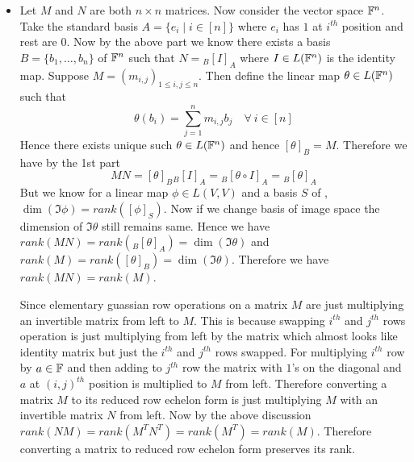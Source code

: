 \documentclass[a4paper, 11pt]{article}
\begin{document}
{\begin{itemize}[label=$\bullet$]
\begin{itemize}
\end{itemize}
Hence invertible matrices correspond to basis changes
\item Let $M$ and $N$ are both $n\times n$ matrices. Now consider the vector space $\mathbb{F}^n$. Take the standard basis $A=\{e_i\mid i\in[n]\}$ where $e_i$ has $1$ at $i^{th}$ position and rest are $0$. Now by the above part we know there exists a basis $B=\{b_1,\dots,b_n\}$ of $\mathbb{F}^n$ such that $N={}_B[I]_A$ where $I\in L(\mathbb{F}^n)$ is the identity map. Suppose $M=(m_{i,j})_{1\leq i,j\leq n}$. Then define the linear map $\theta\in L(\mathbb{F}^n)$ such that $$\theta(b_i)=\sum_{j=1}^n m_{i,j}b_j\quad \forall\ i\in[n]$$Hence there exists unique such $\theta\in L(\mathbb{F}^n)$ and hence $[\theta]_B=M$. Therefore we have by the 1st part $$MN=[\theta]_B{}_B[I]_A={}_B[\theta\circ I]_A={}_B[\theta]_A$$But we know for a linear map $\phi\in L(V,V)$ and a basis $S$ of , $\dim(\Im\phi)=rank([\phi]_S) $. Now if we change basis of image space the dimension of $\Im\theta$ still remains same. Hence we have $rank(MN)=rank({}_B[\theta]_A)=\dim (\Im\theta)$ and $rank(M)=rank([\theta]_B)=\dim (\Im \theta)$. Therefore we have $rank(MN)=rank(M)$. \parinn

Since elementary guassian row operations on a matrix $M$ are just multiplying an invertible matrix from left to $M$. This is because swapping $i^{th}$ and $j^{th}$ rows operation is just multiplying from left by the matrix which  almost  looks like identity matrix but just the $i^{th}$ and $j^{th}$ rows swapped. For multiplying  $i^{th}$ row by $a\in\mathbb{F}$ and then adding to $j^{th}$ row the matrix with $1$'s on the diagonal and $a$ at $(i,j)^{th}$ position is multiplied to $M$ from left.  Therefore converting a matrix $M$ to its reduced row echelon form is just multiplying $M$ with an invertible matrix $N$ from left. Now by the above discussion $rank(NM)=rank(M^TN^T)=rank(M^T)=rank(M)$. Therefore converting a matrix to reduced row echelon form preserves its rank.
\end{itemize}
}
\end{document}
